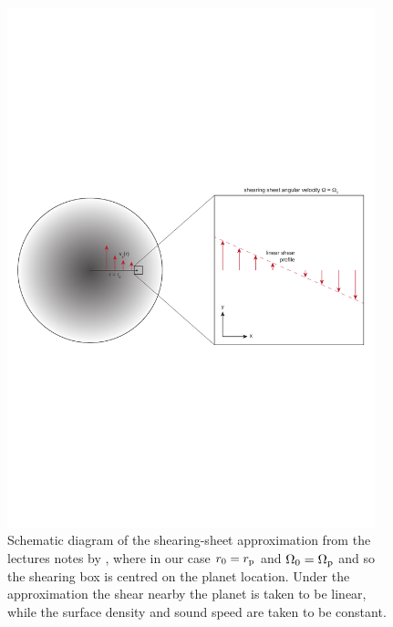 \begin{figure}
    \centering
    \includegraphics[width = 0.95\textwidth]{figures/shearing_sheet.pdf}
    \caption{Schematic diagram of the shearing-sheet approximation from the lectures notes by \citet{armitage2022}, where in our case $r_0 = r_{\rm p}$ and $\Omega_0 = \Omega_{\rm p}$ and so the shearing box is centred on the planet location.
    Under the approximation the shear nearby the planet is taken to be linear, while the surface density and sound speed are taken to be constant.}
    \label{fig:shearing_sheet}
\end{figure}

